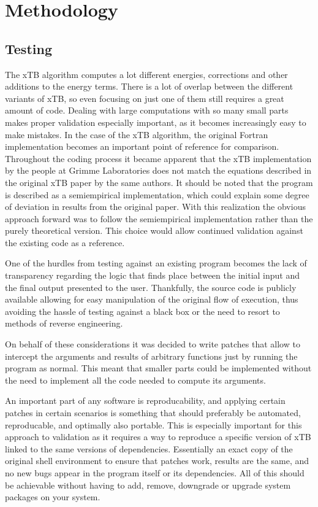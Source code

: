 \section{Methodology}

\subsection{Testing}

The xTB algorithm computes a lot different energies, corrections and other additions to the energy terms. There is a lot of overlap between the different variants of xTB, so even focusing on just one of them still requires a great amount of code.
Dealing with large computations with so many small parts makes proper validation especially important, as it becomes increasingly easy to make mistakes.
In the case of the xTB algorithm, the original Fortran implementation becomes an important point of reference for comparison. Throughout the coding process it became apparent that the xTB implementation by the people at Grimme Laboratories does not match the equations described in the original xTB paper by the same authors. It should be noted that the program is described as a semiempirical implementation, which could explain some degree of deviation in results from the original paper.
With this realization the obvious approach forward was to follow the semiempirical implementation rather than the purely theoretical version. This choice would allow continued validation against the existing code as a reference.

One of the hurdles from testing against an existing program becomes the lack of transparency regarding the logic that finds place between the initial input and the final output presented to the user. Thankfully, the source code is publicly available allowing for easy manipulation of the original flow of execution, thus avoiding the hassle of testing against a black box or the need to resort to methods of reverse engineering.

On behalf of these considerations it was decided to write patches that allow to intercept the arguments and results of arbitrary functions just by running the program as normal. This meant that smaller parts could be implemented without the need to implement all the code needed to compute its arguments.

An important part of any software is reproducability, and applying certain patches in certain scenarios is something that should preferably be automated, reproducable, and optimally also portable. This is especially important for this approach to validation as it requires a way to reproduce a specific version of xTB linked to the same versions of dependencies. Essentially an exact copy of the original shell environment to ensure that patches work, results are the same, and no new bugs appear in the program itself or its dependencies. All of this should be achievable without having to add, remove, downgrade or upgrade system packages on your system.

